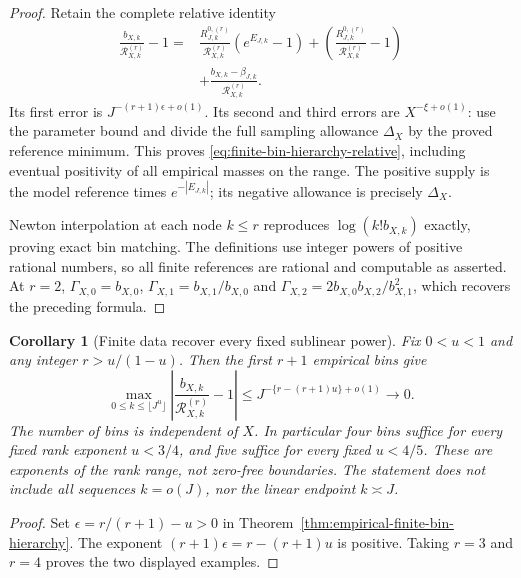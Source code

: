 \documentclass[11pt]{article}
\newtheorem{corollary}[theorem]{Corollary}
\theoremstyle{definition}
\begin{document}
\begin{proof}
Retain the complete relative identity
\begin{equation}
 \begin{aligned}
 \frac{b_{X,k}}{\mathcal R^{(r)}_{X,k}}-1
 ={}&\frac{R^{0,(r)}_{J,k}}{\mathcal R^{(r)}_{X,k}}
                          (e^{E_{J,k}}-1)
      +\left(\frac{R^{0,(r)}_{J,k}}{\mathcal R^{(r)}_{X,k}}-1\right)\\
   &+\frac{b_{X,k}-\beta_{J,k}}{\mathcal R^{(r)}_{X,k}} .
 \end{aligned}
 \label{eq:finite-bin-complete-consumer}
\end{equation}
Its first error is $J^{-(r+1)\epsilon+o(1)}$.
Its second and third errors are $X^{-\xi+o(1)}$:
use the parameter bound and divide the full sampling allowance
$\Delta_X$ by the proved reference minimum.
This proves \eqref{eq:finite-bin-hierarchy-relative}, including
eventual positivity of all empirical masses on the range.
The positive supply is the model reference times
$e^{-|E_{J,k}|}$; its negative allowance is precisely $\Delta_X$.

Newton interpolation at each node $k\le r$ reproduces
$\log(k!b_{X,k})$ exactly, proving exact bin matching.
The definitions use integer powers of positive rational numbers,
so all finite references are rational and computable as asserted.
At $r=2$, $\Gamma_{X,0}=b_{X,0}$,
$\Gamma_{X,1}=b_{X,1}/b_{X,0}$ and
$\Gamma_{X,2}=2b_{X,0}b_{X,2}/b_{X,1}^2$,
which recovers the preceding formula.
\end{proof}

\begin{corollary}[Finite data recover every fixed sublinear power]
\label{cor:finite-bin-every-sublinear-power}
Fix $0<u<1$ and any integer $r>u/(1-u)$.
Then the first $r+1$ empirical bins give
\begin{equation}
 \max_{0\le k\le\lfloor J^u\rfloor}
 \left|\frac{b_{X,k}}{\mathcal R^{(r)}_{X,k}}-1\right|
       \le J^{-\{r-(r+1)u\}+o(1)}\longrightarrow0.
 \label{eq:finite-bin-sublinear-power}
\end{equation}
The number of bins is independent of $X$.
In particular four bins suffice for every fixed rank exponent
$u<3/4$, and five suffice for every fixed $u<4/5$.
These are exponents of the rank range, not zero-free boundaries.
The statement does not include all sequences $k=o(J)$,
nor the linear endpoint $k\asymp J$.
\end{corollary}

\begin{proof}
Set $\epsilon=r/(r+1)-u>0$ in
Theorem~\ref{thm:empirical-finite-bin-hierarchy}.
The exponent $(r+1)\epsilon=r-(r+1)u$ is positive.
Taking $r=3$ and $r=4$ proves the two displayed examples.
\end{proof}
\end{document}
